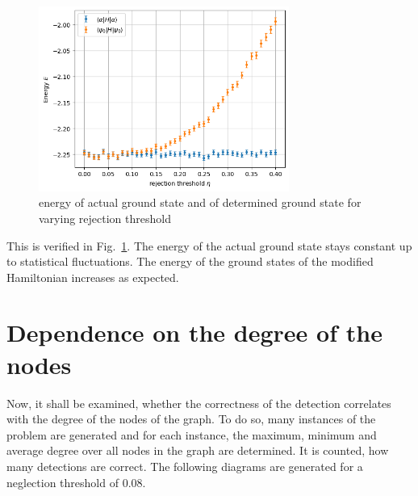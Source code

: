 \documentclass{article}
\begin{document}
	\begin{figure}[h]
		\centering
		\includegraphics[width=0.73\textwidth]{img/energy.png}
		\caption{energy of actual ground state and of determined ground state for varying rejection threshold}
		\label{fig:energy}
	\end{figure}
	This is verified in Fig.~\ref{fig:energy}. The energy of the actual ground state stays constant up to statistical fluctuations. The energy of the ground states of the modified Hamiltonian increases as expected.
	
	
	\section{Dependence on the degree of the nodes}\label{sec:dependence on the degree of the nodes}
	Now, it shall be examined, whether the correctness of the detection correlates with the degree of the nodes of the graph.  To do so, many instances of the problem are generated and for each instance, the maximum, minimum and average degree over all nodes in the graph are determined. It is counted, how many detections are correct. The following diagrams are generated for a neglection threshold of 0.08.
	
\end{document}
